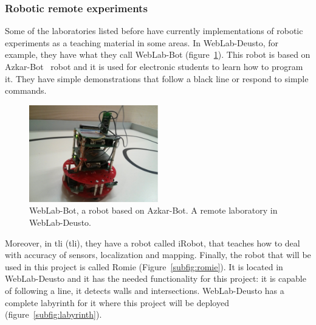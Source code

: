 \subsubsection{Robotic remote experiments}

Some of the laboratories listed before have currently implementations of robotic experiments as a
teaching material in some areas. In WebLab-Deusto, for example, they have what they call WebLab-Bot
(figure~\ref{fig:weblab-bot}). This robot is based on Azkar-Bot~\cite{azkar_bot} robot and it is
used for electronic students to learn how to program it. They have simple demonstrations that follow
a black line or respond to simple commands.

\begin{figure}[ht]
	\centering
	\includegraphics[width=0.5\textwidth]{fig/weblab-bot}
	\caption{WebLab-Bot, a robot based on Azkar-Bot. A remote laboratory in WebLab-Deusto.}
	\label{fig:weblab-bot}
\end{figure}

Moreover, in \acrlong{tli} (\acrshort{tli}), they have a robot called iRobot, that teaches how to
deal with accuracy of sensors, localization and mapping. Finally, the robot that will be used in
this project is called Romie (Figure~\ref{subfig:romie}). It is located in WebLab-Deusto and it has
the needed functionality for this project: it is capable of following a line, it detects walls and
intersections. WebLab-Deusto has a complete labyrinth for it where this project will be deployed
(figure~\ref{subfig:labyrinth}).

